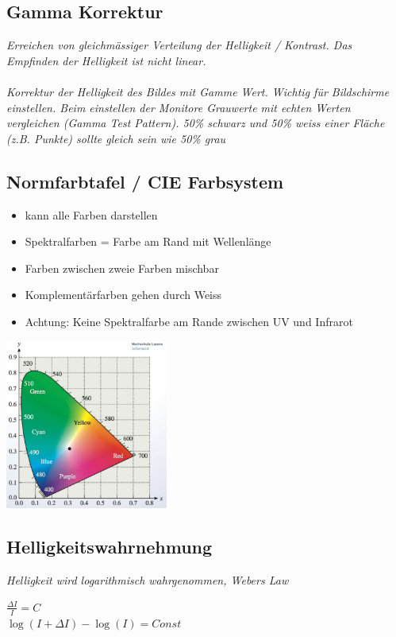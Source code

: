 \subsection{Gamma Korrektur}

\textit{
    Erreichen von gleichmässiger Verteilung der Helligkeit / Kontrast.
    Das Empfinden der Helligkeit ist nicht linear.
} \\
\\
\textit{
    Korrektur der Helligkeit des Bildes mit Gamme Wert. Wichtig für Bildschirme einstellen.
    Beim einstellen der Monitore Grauwerte mit echten Werten vergleichen (Gamma Test Pattern).
    50\% schwarz und 50\% weiss einer Fläche (z.B. Punkte) sollte gleich sein wie 50\% grau
}

\subsection{Normfarbtafel / CIE Farbsystem}
\begin{itemize}
	\item kann alle Farben darstellen
	\item Spektralfarben = Farbe am Rand mit Wellenlänge
	\item Farben zwischen zweie Farben mischbar
	\item Komplementärfarben gehen durch Weiss
	\item Achtung: Keine Spektralfarbe am Rande zwischen UV und Infrarot
\end{itemize}

\includegraphics[width=0.4\textwidth]{assets/color-cie.png}

\subsection{Helligkeitswahrnehmung}

\textit{Helligkeit wird logarithmisch wahrgenommen, Webers Law}

$\frac{\Delta I}{I} = C$ \\
$\log (I + \Delta I) - \log(I) = Const$

